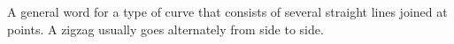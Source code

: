 A general word for a type of curve that consists of several
straight lines joined at points. A zigzag usually goes 
alternately from side to side.